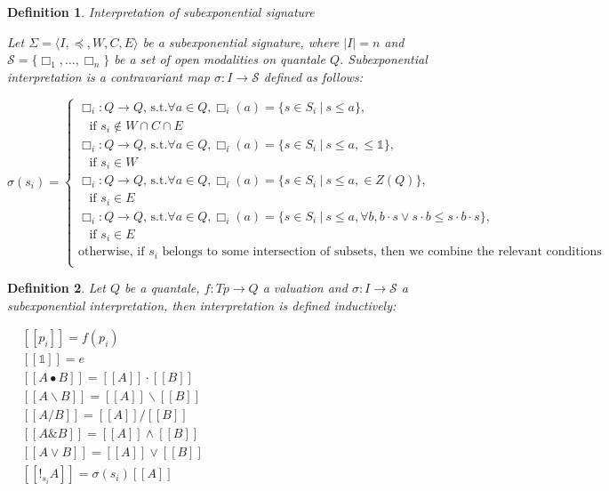 \documentclass[a4paper]{article}
\newtheorem{defin}{Definition}
\begin{document}
\begin{defin} Interpretation of subexponential signature

  Let $\Sigma = \langle I, \preceq, W, C, E \rangle$ be a subexponential signature, where $|I| = n$ and
  $\mathcal{S} = \{ \Box_1, \dots, \Box_n \}$ be a set of open modalities on quantale $Q$.
  Subexponential interpretation is a contravariant map $\sigma : I \to \mathcal{S}$ defined as follows:

  $\sigma(s_i) = \begin{cases}
  \Box_i : Q \to Q \text{, s.t.} \forall a \in Q, \Box_i(a) = \{ s \in S_i \: | \: s \leq a\},
  \\ \:\:\:\: \text{if $s_i \notin W \cap C \cap E$} \\
  \Box_i : Q \to Q \text{, s.t.} \forall a \in Q, \Box_i(a) = \{ s \in S_i \: | \: s \leq a, \leq \mathds{1}\},
  \\ \:\:\:\: \text{if $s_i \in W$} \\
  \Box_i : Q \to Q \text{, s.t.} \forall a \in Q, \Box_i(a) = \{ s \in S_i \: | \: s \leq a, \in Z(Q) \},
  \\ \:\:\:\: \text{if $s_i \in E$} \\
  \Box_i : Q \to Q \text{, s.t.} \forall a \in Q, \Box_i(a) = \{ s \in S_i \: | \: s \leq a, \forall b, b \cdot s \vee s \cdot b \leq s \cdot b \cdot s \},
  \\ \:\:\:\: \text{if $s_i \in E$} \\
  \text{otherwise, if $s_i$ belongs to some intersection of subsets, then we combine the relevant conditions } \\
  \end{cases}$
\end{defin}

\begin{defin} Let $Q$ be a quantale, $f : Tp \to Q$ a valuation and $\sigma : I \to \mathcal{S}$ a subexponential interpretation, then
  interpretation is defined inductively:

\begin{center}
$\begin{array}{lll}
& [\![p_i]\!] = f(p_i)&\\
& [\![\mathds{1}]\!] = e & \\
&[\![A \bullet B]\!] = [\![A]\!] \cdot [\![B]\!] & \\
&[\![A \backslash B]\!] = [\![A]\!] \backslash [\![B]\!] & \\
&[\![A / B]\!] = [\![A]\!] / [\![B]\!]& \\
&[\![A \& B]\!] = [\![A]\!] \wedge [\![B]\!]& \\
&[\![A \vee B]\!] = [\![A]\!] \vee [\![B]\!]& \\
&[\![!_{s_i} A]\!] = \sigma(s_i) [\![A]\!]&
\end{array}$
\end{center}
\end{defin}
\end{document}
